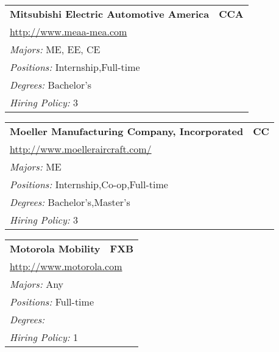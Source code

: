 \documentclass[twoside]{article}
\begin{document}
\begin{center}
\begin{multicols}{3}
\begin{FlushLeft}
\begin{minipage}{.9\columnwidth}
\end{minipage}
 
\begin{minipage}{.9\columnwidth}\begin{tabularx}{.95\columnwidth}{Xr}
                 {\Large\bf Mitsubishi Electric Automotive America} & {\Large\bf CCA}\\
    \multicolumn{2}{p{.95\columnwidth}}{\url{http://www.meaa-mea.com}}\\
    \multicolumn{2}{p{.95\columnwidth}}{\emph{Majors:} ME, EE, CE}\\
    \multicolumn{2}{p{.95\columnwidth}}{\emph{Positions:} Internship,Full-time}\\
    \multicolumn{2}{p{.95\columnwidth}}{\emph{Degrees:} Bachelor's}\\
    \multicolumn{2}{p{.95\columnwidth}}{\emph{Hiring Policy:} 3}\\
    \end{tabularx}
    
\end{minipage}
 
\begin{minipage}{.9\columnwidth}\begin{tabularx}{.95\columnwidth}{Xr}
                 {\Large\bf Moeller Manufacturing Company, Incorporated} & {\Large\bf CC}\\
    \multicolumn{2}{p{.95\columnwidth}}{\url{http://www.moelleraircraft.com/}}\\
    \multicolumn{2}{p{.95\columnwidth}}{\emph{Majors:} ME}\\
    \multicolumn{2}{p{.95\columnwidth}}{\emph{Positions:} Internship,Co-op,Full-time}\\
    \multicolumn{2}{p{.95\columnwidth}}{\emph{Degrees:} Bachelor's,Master's}\\
    \multicolumn{2}{p{.95\columnwidth}}{\emph{Hiring Policy:} 3}\\
    \end{tabularx}
    
\end{minipage}
 
\begin{minipage}{.9\columnwidth}\begin{tabularx}{.95\columnwidth}{Xr}
                 {\Large\bf Motorola Mobility} & {\Large\bf FXB}\\
    \multicolumn{2}{p{.95\columnwidth}}{\url{http://www.motorola.com}}\\
    \multicolumn{2}{p{.95\columnwidth}}{\emph{Majors:} Any}\\
    \multicolumn{2}{p{.95\columnwidth}}{\emph{Positions:} Full-time}\\
    \multicolumn{2}{p{.95\columnwidth}}{\emph{Degrees:} }\\
    \multicolumn{2}{p{.95\columnwidth}}{\emph{Hiring Policy:} 1}\\
    \end{tabularx}
    

\end{minipage}
\end{FlushLeft}
\end{multicols}
\end{center}
\end{document}
